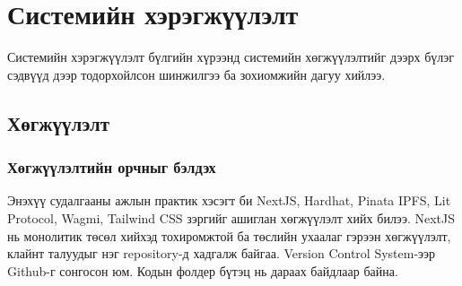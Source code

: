 \chapter{Системийн хэрэгжүүлэлт}
Системийн хэрэгжүүлэлт бүлгийн хүрээнд системийн хөгжүүлэлтийг дээрх бүлэг сэдвүүд дээр тодорхойлсон шинжилгээ ба зохиомжийн дагуу хийлээ.

\section{Хөгжүүлэлт}
\subsection{Хөгжүүлэлтийн орчныг бэлдэх}
Энэхүү судалгааны ажлын практик хэсэгт би NextJS, Hardhat, Pinata IPFS, Lit Protocol, Wagmi, Tailwind CSS зэргийг ашиглан хөгжүүлэлт хийх билээ. NextJS нь монолитик төсөл хийхэд тохиромжтой ба төслийн ухаалаг гэрээн хөгжүүлэлт, клайнт талуудыг нэг repository-д хадгалж байгаа. Version Control System-ээр Github-г сонгосон юм. Кодын фолдер бүтэц нь дараах байдлаар байна.

